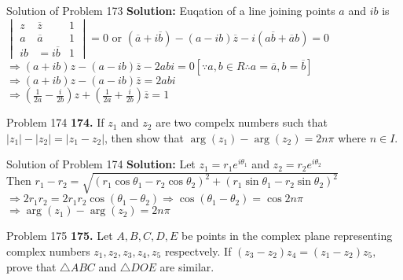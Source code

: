 \documentclass[aspectratio=169,8pt]{beamer}
\begin{document}
\begin{frame}{Solution of Problem 173}
  \textbf{Solution:} Euqation of a line joining points $a$ and $ib$ is\\
  \vspace*{0.2cm}
  $\begin{vmatrix}z & \overline{z} & 1\\ a & \overline{a} & 1 \\ ib & =i\overline{b} & 1\end{vmatrix} = 0$ or $(\overline{a} +
    i\overline{b}) - (a - ib)\overline{z} - i(a\overline{b} + \overline{a}b) = 0$\\
    \vspace*{0.2cm}
    $\Rightarrow (a + ib)z - (a -ib)\overline{z} - 2abi = 0[\because a, b\in R \therefore a = \overline{a}, b = \overline{b}]$\\
    \vspace*{0.2cm}
    $\Rightarrow (a + ib)z - (a -ib)\overline{z} = 2abi$\\
    \vspace*{0.2cm}
    $\Rightarrow \left(\frac{1}{2a} - \frac{i}{2b}\right)z + \left(\frac{1}{2a} + \frac{i}{2b}\right)\overline{z} = 1$
\end{frame}
\begin{frame}{Problem 174}
  \textbf{174.} If $z_1$ and $z_2$ are two compelx numbers such that $|z_1| - |z_2| = |z_1 - z_2|$, then show that $\arg(z_1) -
  \arg(z_2) = 2n\pi$ where $n\in I$.
\end{frame}
\begin{frame}{Solution of Problem 174}
  \textbf{Solution:} Let $z_1 = r_1e^{i\theta_1}$ and $z_2 = r_2e^{i\theta_2}$\\
  \vspace*{0.2cm}
  Then $r_1 - r_2 = \sqrt{(r_1\cos\theta_1 - r_2\cos\theta_2)^2 + (r_1\sin\theta_1 - r_2\sin\theta_2)^2}$\\
  \vspace*{0.2cm}
  $\Rightarrow 2r_1r_2 = 2r_1r_2\cos(\theta_1 - \theta_2)\Rightarrow \cos(\theta_1- \theta_2) = \cos 2n\pi$\\
  \vspace*{0.2cm}
  $\Rightarrow \arg(z_1) - \arg(z_2) = 2n\pi$
\end{frame}
\begin{frame}{Problem 175}
  \textbf{175.} Let $A, B, C, D, E$ be points in the complex plane representing complex numbers $z_1, z_2, z_3, z_4, z_5$
  respectvely. If $(z_3 - z_2)z_4 = (z_1 - z_2)z_5,$ prove that $\triangle ABC$ and $\triangle DOE$ are similar.
\end{frame}
\end{document}
